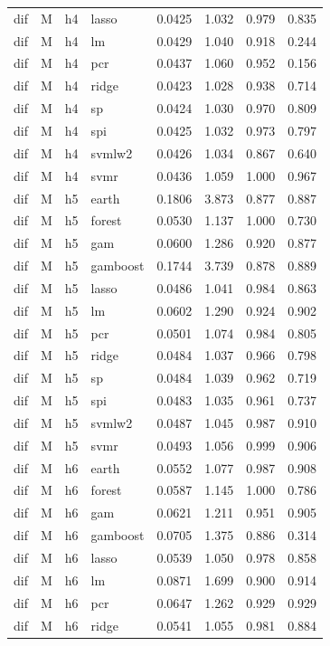 \begin{ThreePartTable}
\begin{longtable}[t]{llclcccc}
dif & M & h4 & lasso & 0.0425 & 1.032 & 0.979 & 0.835\\
dif & M & h4 & lm & 0.0429 & 1.040 & 0.918 & 0.244\\
dif & M & h4 & pcr & 0.0437 & 1.060 & 0.952 & 0.156\\
dif & M & h4 & ridge & 0.0423 & 1.028 & 0.938 & 0.714\\
dif & M & h4 & sp & 0.0424 & 1.030 & 0.970 & 0.809\\
dif & M & h4 & spi & 0.0425 & 1.032 & 0.973 & 0.797\\
dif & M & h4 & svmlw2 & 0.0426 & 1.034 & 0.867 & 0.640\\
dif & M & h4 & svmr & 0.0436 & 1.059 & 1.000 & 0.967\\
\addlinespace
dif & M & h5 & earth & 0.1806 & 3.873 & 0.877 & 0.887\\
dif & M & h5 & forest & 0.0530 & 1.137 & 1.000 & 0.730\\
dif & M & h5 & gam & 0.0600 & 1.286 & 0.920 & 0.877\\
dif & M & h5 & gamboost & 0.1744 & 3.739 & 0.878 & 0.889\\
dif & M & h5 & lasso & 0.0486 & 1.041 & 0.984 & 0.863\\
dif & M & h5 & lm & 0.0602 & 1.290 & 0.924 & 0.902\\
dif & M & h5 & pcr & 0.0501 & 1.074 & 0.984 & 0.805\\
dif & M & h5 & ridge & 0.0484 & 1.037 & 0.966 & 0.798\\
dif & M & h5 & sp & 0.0484 & 1.039 & 0.962 & 0.719\\
dif & M & h5 & spi & 0.0483 & 1.035 & 0.961 & 0.737\\
dif & M & h5 & svmlw2 & 0.0487 & 1.045 & 0.987 & 0.910\\
dif & M & h5 & svmr & 0.0493 & 1.056 & 0.999 & 0.906\\
\addlinespace
dif & M & h6 & earth & 0.0552 & 1.077 & 0.987 & 0.908\\
dif & M & h6 & forest & 0.0587 & 1.145 & 1.000 & 0.786\\
dif & M & h6 & gam & 0.0621 & 1.211 & 0.951 & 0.905\\
dif & M & h6 & gamboost & 0.0705 & 1.375 & 0.886 & 0.314\\
dif & M & h6 & lasso & 0.0539 & 1.050 & 0.978 & 0.858\\
dif & M & h6 & lm & 0.0871 & 1.699 & 0.900 & 0.914\\
dif & M & h6 & pcr & 0.0647 & 1.262 & 0.929 & 0.929\\
dif & M & h6 & ridge & 0.0541 & 1.055 & 0.981 & 0.884\\

\end{longtable}
\end{ThreePartTable}
